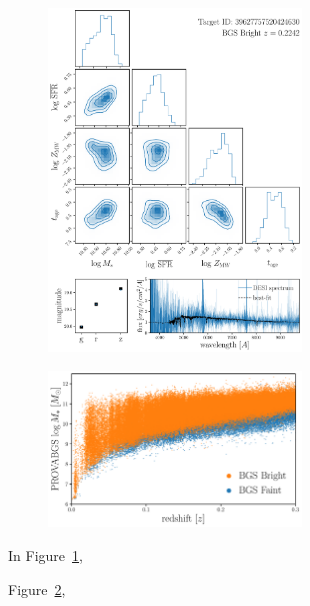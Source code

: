 \begin{figure}
\begin{center}
    \includegraphics[width=0.6\textwidth]{figs/provabgs_posterior.pdf}
    \caption{
    }\label{fig:posterior}
\end{center}
\end{figure}


\begin{figure}
\begin{center}
    \includegraphics[width=0.6\textwidth]{figs/mstar_z.pdf}
    \caption{
    }\label{fig:mstar_z}
\end{center}
\end{figure}


In Figure~\ref{fig:posterior}, 

Figure~\ref{fig:mstar_z},
